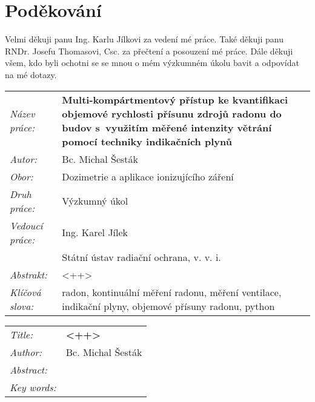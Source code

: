 \section*{Poděkování}
Velmi děkuji panu Ing. Karlu Jílkovi za vedení mé práce. Také děkuji panu RNDr. Josefu Thomasovi, Csc. za přečtení a posouzení mé práce. Dále děkuji všem, kdo byli ochotni se se mnou o mém výzkumném úkolu bavit a odpovídat na mé dotazy. 
\newpage
\begin{tabularx}{\textwidth}{>{\itshape}l X}
  Název práce: & \textbf{Multi-kompártmentový přístup ke kvantifikaci  objemové rychlosti přísunu zdrojů radonu do budov s využitím měřené intenzity větrání pomocí techniky indikačních plynů}\\
  Autor: & Bc. Michal Šesták\\
  Obor: & Dozimetrie a aplikace ionizujícího záření\\
  Druh práce: & Výzkumný úkol\\
  Vedoucí práce: & Ing. Karel Jílek\\ 
               & Státní ústav radiační ochrana, v. v. i.\\
  Abstrakt: & <++>\\
  Klíčová slova: & radon, kontinuální měření radonu, měření ventilace, indikační plyny, objemové přísuny radonu, python  
\end{tabularx}
\newpage
\begin{tabularx}{\textwidth}{>{\itshape}l X}
  Title: & \textbf{<++>}\\
  Author: & Bc. Michal Šesták\\
  Abstract: & \\
  Key words: & 
\end{tabularx}
\newpage 
